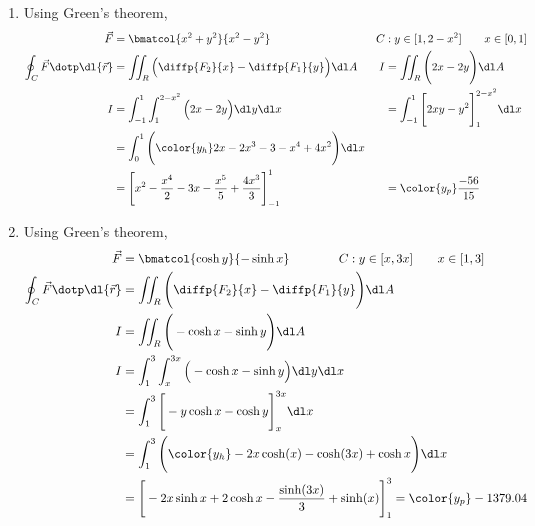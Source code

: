 \begin{enumerate}
    \item Using Green's theorem,
          \begin{align}
              \vec{F}         & = \bmatcol{x^2 + y^2}{x^2 - y^2}                  &
              C               & : y \in [1 , 2 - x^2] \qquad x \in [0, 1]           \\
              \oint_C \vec{F} \dotp \dl{\vec{r}}
                              & = \iint_R \Big( \diffp {F_2}{x} - \diffp{F_1}{y}
              \Big)
              \dl A           &
              I               & = \iint_R \Bigg( 2x - 2y \Bigg) \dl A               \\
              I               & = \int_{-1}^{1} \int_{1}^{2 - x^2} \Big( 2x - 2y
              \Big)
              \dl y \dl x     &
                              & =  \int_{-1}^{1} \Bigg[ 2xy - y^2
                  \Bigg]_{1}^{2 - x^2}
              \dl x                                                                 \\
                              & = \int_{0}^{1} \Bigg({\color{y_h} 2x - 2x^3
                  - 3 - x^4 + 4x^2} \Bigg)
              \dl x                                                                 \\
                              & = \Bigg[ x^2 - \frac{x^4}{2} - 3x - \frac{x^5}{5}
                  + \frac{4x^3}{3}
              \Bigg]_{-1}^{1} &
                              & = \color{y_p} \frac{-56}{15}
          \end{align}

    \item Using Green's theorem,
          \begin{align}
              \vec{F} & = \bmatcol{\cosh y}{-\sinh x} \qquad \qquad
              C : y \in [x, 3x] \qquad x \in [1, 3]                           \\
              \oint_C \vec{F} \dotp \dl{\vec{r}}
                      & = \iint_R \Bigg( \diffp {F_2}{x} - \diffp{F_1}{y}
              \Bigg) \dl A                                                    \\
              I       & = \iint_R \Bigg( -\cosh x - \sinh y \Bigg) \dl A      \\
              I       & = \int_{1}^{3} \int_{x}^{3x} \Big( -\cosh x - \sinh y
              \Big)
              \dl y \dl x                                                     \\
                      & =  \int_{1}^{3} \Bigg[ -y\cosh x - \cosh y
                  \Bigg]_{x}^{3x}
              \dl x                                                           \\
                      & = \int_{1}^{3} \Bigg({\color{y_h} -2x\cosh(x)
                  -\cosh(3x) + \cosh x} \Bigg)
              \dl x                                                           \\
                      & = \Bigg[ -2x\sinh x + 2\cosh x - \frac{\sinh(3x)}{3}
                  + \sinh(x) \Bigg]_{1}^{3} = \color{y_p} -1379.04
          \end{align}


\end{enumerate}
